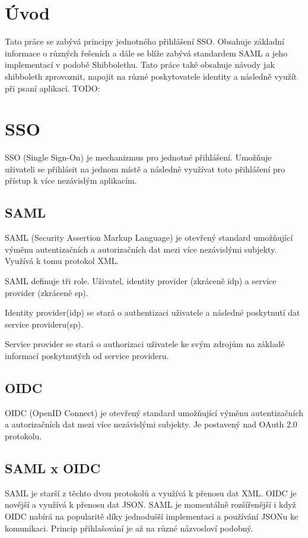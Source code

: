 \chapter{Úvod}
Tato práce se zabývá principy jednotného přihlášení SSO. Obsahuje základní informace o různých řešeních a dále se blíže zabývá standardem SAML a jeho implementací v podobě Shibbolethu. Tato práce také obsahuje návody jak shibboleth zprovoznit, napojit na různé poskytovatele identity a následně využít při psaní aplikací.
TODO:
\chapter{SSO}
\label{sso}
SSO (Single Sign-On) je mechanizmus pro jednotné přihlášení. Umožňuje uživateli se přihlásit na jednom místě a následně využívat toto přihlášení pro přístup k více nezávislým aplikacím. \cite{SSO}


\section{SAML}

SAML\cite{SAMLofficialSite}\cite{WhatIsSaml} (Security Assertion Markup Language) je otevřený standard umožňující výměnu autentizačních a autorizačních dat mezi více nezávislými subjekty. Využívá k tomu protokol XML. 

SAML definuje tři role. Uživatel, identity provider (zkráceně idp) a service provider (zkráceně sp). 

Identity provider(idp) se stará o authentizaci uživatele a následné poskytnutí dat service provideru(sp).

Service provider se stará o authorizaci uživatele ke svým zdrojům na základě informací poskytnutých od service provideru.




\section{OIDC}

OIDC (OpenID Connect) je otevřený standard umožňující výměnu autentizačních a autorizačních dat mezi více nezávislými subjekty. Je postavený nad OAuth 2.0 protokolu.\cite{OIDC}

\section{SAML x OIDC}

SAML je starší z těchto dvou protokolů a využívá k přenosu dat XML. OIDC je novější a využívá k přenosu dat JSON. 
SAML je momentálně rozšířenější i když OIDC nabírá na popularitě díky jednodušší implementaci a používání JSONu ke komunikaci.\cite{SAMLxOIDC}
Princip přihlašování je až na různé názvosloví podobný.

